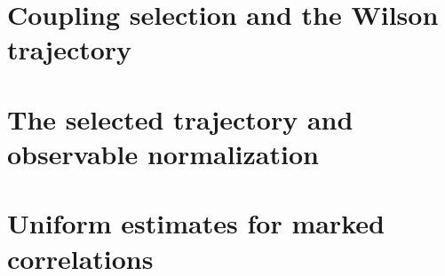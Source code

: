 \documentclass[11pt]{article}
\theoremstyle{remark}
\numberwithin{equation}{section}
\begin{document}
\section{Coupling selection and the Wilson trajectory}















\section{The selected trajectory and observable normalization}












\section{Uniform estimates for marked correlations}





















\end{document}
